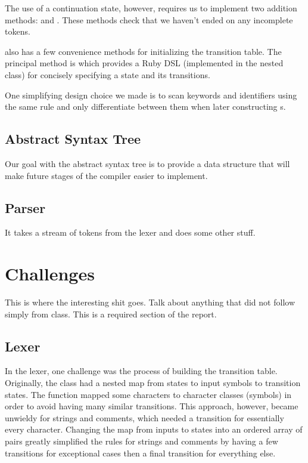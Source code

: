 \documentclass[pdftex,11pt,a4paper]{article}
\begin{document}
The use of a continuation state, however, requires us to implement two
addition  methods:  and 
. These methods check that we haven't
ended on any incomplete tokens.

 also has a few convenience methods for initializing the
transition table. The principal method is  which provides a
Ruby DSL (implemented in the  nested class) for
concisely specifying a state and its transitions.

One simplifying design choice we made is to scan keywords and identifiers
using the same rule and only differentiate between them when later
constructing s.

\subsection{Abstract Syntax Tree}

Our goal with the abstract syntax tree is to provide a data structure
that will make future stages of the compiler easier to implement.


\subsection{Parser}

It takes a stream of tokens from the lexer and does some other stuff.


\section{Challenges}


This is where the interesting shit goes. Talk about anything that did
not follow simply from class. This is a required section of the report.

\subsection{Lexer}

In the lexer, one challenge was the process of building the transition
table. Originally, the  class had a nested map from states
to input symbols to transition states. The  function
mapped some characters to character classes (symbols) in order to avoid
having many similar transitions. This approach, however, became
unwieldy for strings and comments, which needed a transition for
essentially every character. Changing the map from inputs to states
into an ordered array of  pairs greatly simplified
the rules for strings and comments by having a few transitions for
exceptional cases then a final transition for everything else.
\end{document}
